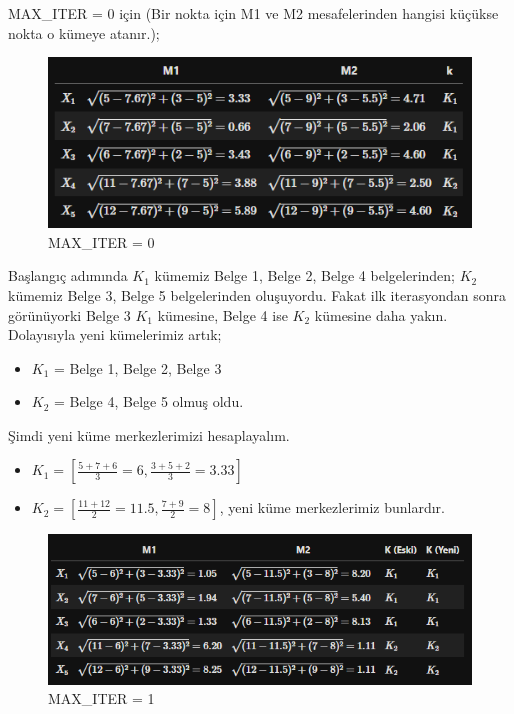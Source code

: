 \newpage

MAX\_ITER = 0 için (Bir nokta için M1 ve M2 mesafelerinden hangisi küçükse nokta o kümeye atanır.);

\begin{figure}[h]
    \centering
    \includegraphics[width=1.0\textwidth]{images/kmeans_step_1.png}
    \caption{MAX\_ITER = 0}
    \label{fig:enter-label}
\end{figure}

Başlangıç adımında $K_1$ kümemiz Belge 1, Belge 2, Belge 4 belgelerinden; $K_2$ kümemiz Belge 3, Belge 5 belgelerinden oluşuyordu. Fakat ilk iterasyondan sonra görünüyorki Belge 3 $K_1$ kümesine, Belge 4 ise $K_2$ kümesine daha yakın. Dolayısıyla yeni kümelerimiz artık;

\begin{itemize}
    \item $K_1$ = Belge 1, Belge 2, Belge 3
    \item $K_2$ = Belge 4, Belge 5 olmuş oldu.
\end{itemize}

Şimdi yeni küme merkezlerimizi hesaplayalım.

\begin{itemize}
    \item $K_1 = [\frac{5 + 7 + 6}{3} = 6, \frac{3 + 5 + 2}{3} = 3.33]$
    \item $K_2 = [\frac{11 + 12}{2} = 11.5, \frac{7 + 9}{2} = 8]$, yeni küme merkezlerimiz bunlardır.
\end{itemize}

\begin{figure}[h]
    \centering
    \includegraphics[width=1.0\textwidth]{images/kmeans_step_2.png}
    \caption{MAX\_ITER = 1}
    \label{fig:enter-label}
\end{figure}


